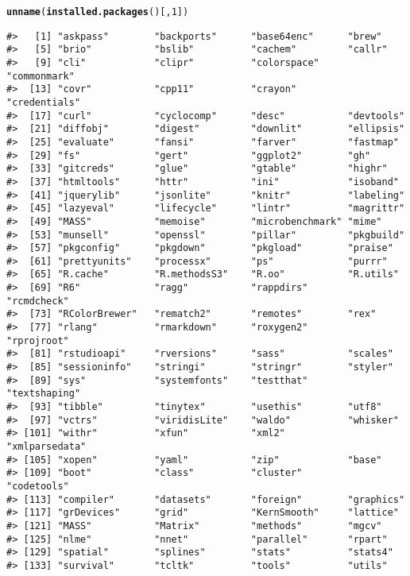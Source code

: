 \documentclass{article}\usepackage[]{graphicx}\usepackage[]{color}
\makeatletter
\newcommand{\hlnum}[1]{\textcolor[rgb]{0.686,0.059,0.569}{#1}}%
\newcommand{\hlstd}[1]{\textcolor[rgb]{0.345,0.345,0.345}{#1}}%
\newcommand{\hlkwd}[1]{\textcolor[rgb]{0.737,0.353,0.396}{\textbf{#1}}}%
\newenvironment{kframe}{%
 \def\at@end@of@kframe{}%
 \ifinner\ifhmode%
  \def\at@end@of@kframe{\end{minipage}}%
  \begin{minipage}{\columnwidth}%
 \fi\fi%
 \def\FrameCommand##1{\hskip\@totalleftmargin \hskip-\fboxsep
 \colorbox{shadecolor}{##1}\hskip-\fboxsep
     \hskip-\linewidth \hskip-\@totalleftmargin \hskip\columnwidth}%
 \MakeFramed {\advance\hsize-\width
   \@totalleftmargin\z@ \linewidth\hsize
   \@setminipage}}%
 {\par\unskip\endMakeFramed%
 \at@end@of@kframe}
\newenvironment{knitrout}{}{} %
\makeatother
\begin{document}
\begin{knitrout}
\color{fgcolor}\begin{kframe}
\begin{alltt}
\hlkwd{unname}\hlstd{(}\hlkwd{installed.packages}\hlstd{()[,} \hlnum{1}\hlstd{])}
\end{alltt}
\begin{verbatim}
#>   [1] "askpass"        "backports"      "base64enc"      "brew"          
#>   [5] "brio"           "bslib"          "cachem"         "callr"         
#>   [9] "cli"            "clipr"          "colorspace"     "commonmark"    
#>  [13] "covr"           "cpp11"          "crayon"         "credentials"   
#>  [17] "curl"           "cyclocomp"      "desc"           "devtools"      
#>  [21] "diffobj"        "digest"         "downlit"        "ellipsis"      
#>  [25] "evaluate"       "fansi"          "farver"         "fastmap"       
#>  [29] "fs"             "gert"           "ggplot2"        "gh"            
#>  [33] "gitcreds"       "glue"           "gtable"         "highr"         
#>  [37] "htmltools"      "httr"           "ini"            "isoband"       
#>  [41] "jquerylib"      "jsonlite"       "knitr"          "labeling"      
#>  [45] "lazyeval"       "lifecycle"      "lintr"          "magrittr"      
#>  [49] "MASS"           "memoise"        "microbenchmark" "mime"          
#>  [53] "munsell"        "openssl"        "pillar"         "pkgbuild"      
#>  [57] "pkgconfig"      "pkgdown"        "pkgload"        "praise"        
#>  [61] "prettyunits"    "processx"       "ps"             "purrr"         
#>  [65] "R.cache"        "R.methodsS3"    "R.oo"           "R.utils"       
#>  [69] "R6"             "ragg"           "rappdirs"       "rcmdcheck"     
#>  [73] "RColorBrewer"   "rematch2"       "remotes"        "rex"           
#>  [77] "rlang"          "rmarkdown"      "roxygen2"       "rprojroot"     
#>  [81] "rstudioapi"     "rversions"      "sass"           "scales"        
#>  [85] "sessioninfo"    "stringi"        "stringr"        "styler"        
#>  [89] "sys"            "systemfonts"    "testthat"       "textshaping"   
#>  [93] "tibble"         "tinytex"        "usethis"        "utf8"          
#>  [97] "vctrs"          "viridisLite"    "waldo"          "whisker"       
#> [101] "withr"          "xfun"           "xml2"           "xmlparsedata"  
#> [105] "xopen"          "yaml"           "zip"            "base"          
#> [109] "boot"           "class"          "cluster"        "codetools"     
#> [113] "compiler"       "datasets"       "foreign"        "graphics"      
#> [117] "grDevices"      "grid"           "KernSmooth"     "lattice"       
#> [121] "MASS"           "Matrix"         "methods"        "mgcv"          
#> [125] "nlme"           "nnet"           "parallel"       "rpart"         
#> [129] "spatial"        "splines"        "stats"          "stats4"        
#> [133] "survival"       "tcltk"          "tools"          "utils"
\end{verbatim}
\end{kframe}
\end{knitrout}

\nocite{R-2021}

\printbibliography
\end{document}
